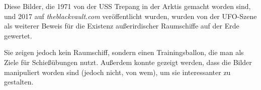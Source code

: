 \documentclass{scrartcl}
\begin{document}
Diese Bilder, die 1971 von der USS Trepang in der Arktis gemacht worden sind, und 2017 auf \textit{theblackvault.com} veröffentlicht wurden, wurden von der UFO-Szene als weiterer Beweis für die Existenz außerirdischer Raumschiffe auf der Erde gewertet.

Sie zeigen jedoch kein Raumschiff, sondern einen Trainingsballon, die man als Ziele für Schießübungen nutzt. Außerdem konnte gezeigt werden, dass die Bilder manipuliert worden sind (jedoch nicht, von wem), um sie interessanter zu gestalten.

\end{document}
